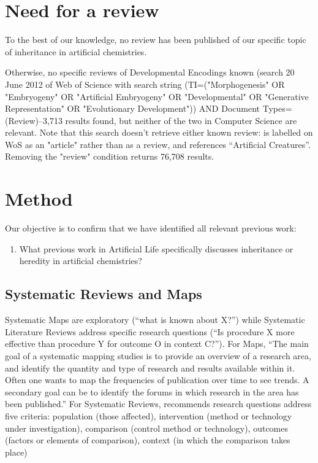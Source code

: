 \section{Need for a review}

To the best of our knowledge, no review has been published of our specific topic of inheritance in artificial chemistries.

Otherwise, no specific reviews of Developmental Encodings known (search 20 June 2012 of Web of Science with search string
(TI=("Morphogenesis" OR "Embryogeny" OR "Artificial Embryogeny" OR "Developmental" OR "Generative Representation" OR
"Evolutionary Development")) AND Document Types=(Review)--3,713 results found, but neither of the two in Computer
Science are relevant. Note that this search doesn't retrieve either known review: \cite{Stanley:2003fh} is labelled on WoS as an
"article" rather than as a review, and \cite{Duthen2010} references ``Artificial Creatures''. Removing the "review" condition returns 76,708 results.

\section{Method}

Our objective is to confirm that we have identified all relevant previous work:

\begin{enumerate}[label=RQ\arabic*:]
	\item What previous work in Artificial Life specifically discusses inheritance or heredity in artificial chemistries?
\end{enumerate}

\subsection{Systematic Reviews and Maps}

Systematic Maps \parencite{Petersen:2008fk}are exploratory (``what is known about X?'') while Systematic Literature Reviews \parencite{Kitchenham:2007nx} address specific research questions (``Is procedure X more effective than procedure Y for outcome O in context C?''). For Maps, ``The main goal of a systematic mapping studies is to provide an overview of a research area, and identify the quantity and type of research and results available within it. Often one wants to map the frequencies of publication over time to see trends. A secondary goal can be to identify the forums in which research in the area has been published.'' \parencite{Petersen:2008fk} For Systematic Reviews, \cite{Kitchenham:2007nx} recommends research questions address five criteria: population (those affected), intervention (method or technology under investigation), comparison (control method or technology), outcomes (factors or elements of comparison), context (in which the comparison takes place)

